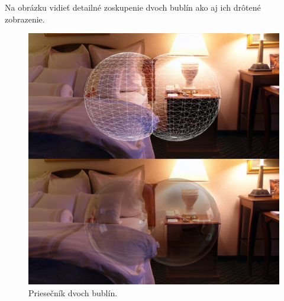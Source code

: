 \newpage
Na obrázku  vidieť detailné zoskupenie dvoch bublín ako aj ich drôtené zobrazenie.
\begin{figure}[H]
	\begin{center}
		\includegraphics[width=\textwidth]{images/double_bubble}
		\caption{Priesečník dvoch bublín.}
		\label{img:two-bubbles}
	\end{center}
\end{figure}